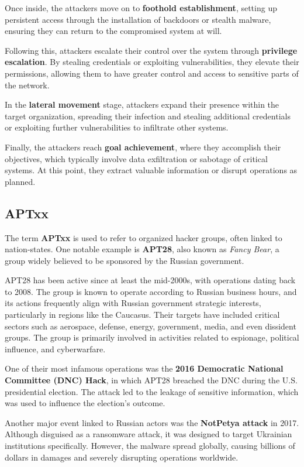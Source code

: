 Once inside, the attackers move on to \textbf{foothold establishment},
setting up persistent access through the installation of backdoors or
stealth malware, ensuring they can return to the compromised system at
will.

Following this, attackers escalate their control over the system
through \textbf{privilege escalation}. By stealing credentials or
exploiting vulnerabilities, they elevate their permissions, allowing
them to have greater control and access to sensitive parts of the
network.

In the \textbf{lateral movement} stage, attackers expand their
presence within the target organization, spreading their infection and
stealing additional credentials or exploiting further vulnerabilities
to infiltrate other systems.

Finally, the attackers reach \textbf{goal achievement}, where they
accomplish their objectives, which typically involve data exfiltration
or sabotage of critical systems. At this point, they extract valuable
information or disrupt operations as planned.

\subsection{APTxx}
The term \textbf{APTxx} is used to refer to organized hacker groups,
often linked to nation-states. One notable example is \textbf{APT28},
also known as \textit{Fancy Bear}, a group widely believed to be
sponsored by the Russian government.

APT28 has been active since at least the mid-2000s, with operations
dating back to 2008. The group is known to operate according to
Russian business hours, and its actions frequently align with Russian
government strategic interests, particularly in regions like the
Caucasus. Their targets have included critical sectors such as
aerospace, defense, energy, government, media, and even dissident
groups. The group is primarily involved in activities related to
espionage, political influence, and cyberwarfare.

One of their most infamous operations was the \textbf{2016 Democratic
National Committee (DNC) Hack}, in which APT28 breached the DNC during
the U.S. presidential election. The attack led to the leakage of
sensitive information, which was used to influence the election’s
outcome.

Another major event linked to Russian actors was the \textbf{NotPetya
attack} in 2017. Although disguised as a ransomware attack, it was
designed to target Ukrainian institutions specifically. However, the
malware spread globally, causing billions of dollars in damages and
severely disrupting operations worldwide.

